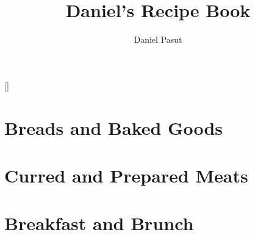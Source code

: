 \documentclass[twoside,letterpaper,11pt]{article}
\title{\vspace*{6cm}Daniel's Recipe Book}
\author{Daniel Pasut}
\begin{document}
\begin{titlepage}
  \clearpage\maketitle
  \thispagestyle{empty}
\end{titlepage}
\thispagestyle{empty}
\clearpage
\begingroup
\pagestyle{empty}
\null
\newpage
\endgroup
{} %
\tableofcontents
\clearpage
{}

\titleformat{\section}[block]{\fontsize{72pt}{72pt}\bfseries\sffamily\center}{}{0em}{}[\thispagestyle{empty}\cleardoublepage]
\titlespacing{\section}{0pt}{150pt}{40pt}


\phantom{text}
\section{Breads and Baked Goods}
\label{bread:noknead}\newpage
\label{bread:focaccia}\newpage
\newpage
\newpage


\newpage

\vspace{150pt} %
\phantom{text}
\section{Curred and Prepared Meats}
\newpage
\newpage
\newpage

\vspace{150pt} %
\phantom{text}
\section{Breakfast and Brunch}
\end{document}
